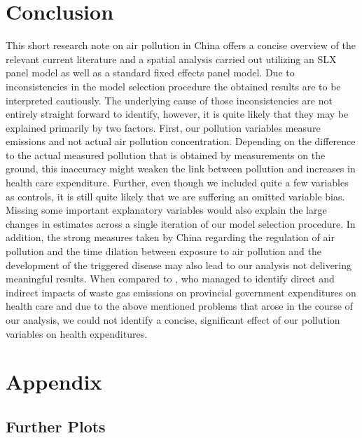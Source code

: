 \documentclass[
]{article}
\begin{document}
	\section{Conclusion} \label{Conclusion}
	
	This short research note on air pollution in China offers a concise overview of the relevant current literature and a spatial analysis carried out utilizing an SLX panel model as well as a standard fixed effects panel model. Due to inconsistencies in the model selection procedure the obtained results are to be interpreted cautiously. The underlying cause of those inconsistencies are not entirely straight forward to identify, however, it is quite likely that they may be explained primarily by two factors. First, our pollution variables measure emissions and not actual air pollution concentration. Depending on the difference to the actual measured pollution that is obtained by measurements on the ground, this inaccuracy might weaken the link between pollution and increases in health care expenditure. Further, even though we included quite a few variables as controls, it is still quite likely that we are suffering an omitted variable bias. Missing some important explanatory variables would also explain the large changes in estimates across a single iteration of our model selection procedure. In addition, the strong measures taken by China regarding the regulation of air pollution and the time dilation between exposure to air pollution and the development of the triggered disease may also lead to our analysis not delivering meaningful results. 
	When compared to \cite{zeng2019does}, who managed to identify direct and indirect impacts of waste gas emissions on provincial government expenditures on health care and due to the above mentioned problems that arose in the course of our analysis, we could not identify a concise, significant effect of our pollution variables on health expenditures.
	

	\newpage
	\printbibliography[heading=bibintoc]
	\newpage
	\appendix
	\section{Appendix}
	\subsection{Further Plots}
\end{document}
